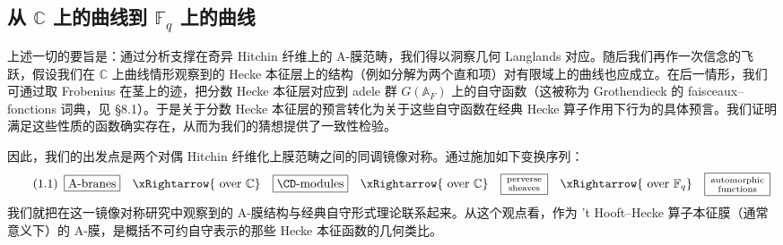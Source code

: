 \subsection{从 \texorpdfstring{$\mathbb{C}$}{C} 上的曲线到 \texorpdfstring{$\mathbb{F}_q$}{Fq} 上的曲线}

上述一切的要旨是：通过分析支撑在奇异 Hitchin 纤维上的 A-膜范畴，我们得以洞察几何 Langlands 对应。随后我们再作一次信念的飞跃，假设我们在 $\mathbb{C}$ 上曲线情形观察到的 Hecke 本征层上的结构（例如分解为两个直和项）对有限域上的曲线也应成立。在后一情形，我们可通过取 Frobenius 在茎上的迹，把分数 Hecke 本征层对应到 adele 群 $G(\mathbb{A}_F)$ 上的自守函数（这被称为 Grothendieck 的 faisceaux--fonctions 词典，见 §8.1）。于是关于分数 Hecke 本征层的预言转化为关于这些自守函数在经典 Hecke 算子作用下行为的具体预言。我们证明满足这些性质的函数确实存在，从而为我们的猜想提供了一致性检验。

因此，我们的出发点是两个对偶 Hitchin 纤维化上膜范畴之间的同调镜像对称。通过施加如下变换序列：
\begin{equation}\tag{1.1}
\begin{array}{ccccccc}
\boxed{\text{A-branes}} & \xRightarrow{\ \text{over }\mathbb{C}} &
\boxed{\CD\text{-modules}} & \xRightarrow{\ \text{over }\mathbb{C}} &
\boxed{\begin{smallmatrix}\text{perverse}\\ \text{sheaves}\end{smallmatrix}} & \xRightarrow{\ \text{over }\mathbb{F}_q} &
\boxed{\begin{smallmatrix}\text{automorphic}\\ \text{functions}\end{smallmatrix}}
\end{array}
\end{equation}
我们就把在这一镜像对称研究中观察到的 A-膜结构与经典自守形式理论联系起来。从这个观点看，作为 't Hooft--Hecke 算子本征膜（通常意义下）的 A-膜，是概括不可约自守表示的那些 Hecke 本征函数的几何类比。


